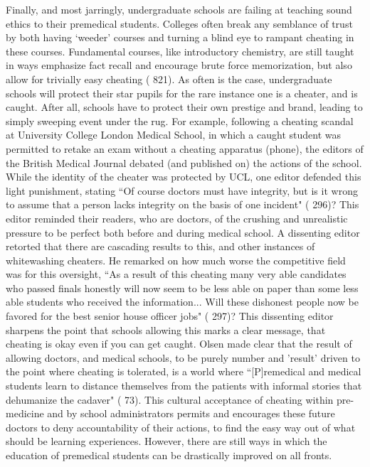 \documentclass [12pt]{article}
\begin{document}
\begin{flushleft}
Finally, and most jarringly, undergraduate schools are failing at teaching sound ethics to their premedical students. Colleges often break any semblance of trust by both having {`}weeder' courses and turning a blind eye to rampant cheating in these courses. Fundamental courses, like introductory chemistry, are still taught in ways emphasize fact recall and encourage brute force memorization, but also allow for trivially easy cheating (\cite{Cooper-2013} 821). As often is the case, undergraduate schools will protect their star pupils for the rare instance one is a cheater, and is caught. After all, schools have to protect their own prestige and brand, leading to simply sweeping event under the rug. For example, following a cheating scandal at University College London Medical School, in which a caught student was permitted to retake an exam without a cheating apparatus (phone), the editors of the British Medical Journal debated (and published on) the actions of the school. While the identity of the cheater was protected by UCL, one editor defended this light punishment, stating {``}Of course doctors must have integrity, but is it wrong to assume that a person lacks integrity on the basis of one incident" (\cite{Spencer-2001} 296)? This editor reminded their readers, who are doctors, of the crushing and unrealistic pressure to be perfect both before and during medical school. A dissenting editor retorted that there are cascading results to this, and other instances of whitewashing cheaters. He remarked on how much worse the competitive field was for this oversight, {``}As a result of this cheating many very able candidates who passed finals honestly will now seem to be less able on paper than some less able students who received the information... Will these dishonest people now be favored for the best senior house officer jobs" (\cite{Spencer-2001} 297)? This dissenting editor sharpens the point that schools allowing this marks a clear message, that cheating is okay even if you can get caught. Olsen made clear that the result of allowing doctors, and medical schools, to be purely number and 'result' driven to the point where cheating is tolerated, is a world where {``}[P]remedical and medical students learn to distance themselves from the patients with informal stories that dehumanize the cadaver" (\cite{Olsen-2016} 73). This cultural acceptance of cheating within pre-medicine and by school administrators permits and encourages these future doctors to deny accountability of their actions, to find the easy way out of what should be learning experiences. However, there are still ways in which the education of premedical students can be drastically improved on all fronts.
	

\end{flushleft}
\end{document}
